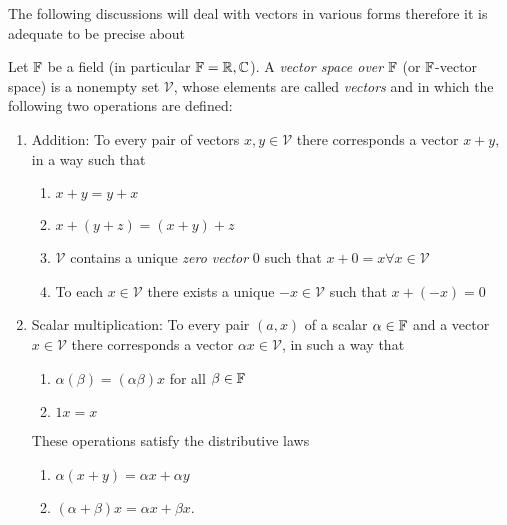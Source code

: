 The following discussions will deal with vectors in various forms therefore
it is adequate to be precise about
\begin{definition}
	Let $\mathbb{F}$ be a field (in particular $\mathbb{F} = \mathbb{R},\mathbb{C}$). A \emph{vector space
	over} $\mathbb{F}$ (or $\mathbb{F}$-vector space) is a nonempty set $\mathcal{V}$, whose
	elements are called \emph{vectors} and in which the following two operations
	are defined:
	\begin{enumerate}
		\item Addition: To every pair of vectors $x, y \in \mathcal{V}$ there
		corresponds a vector $x + y$, in a way such that
		\begin{enumerate}[label=(\alph*)]
			\item $x + y = y + x$
			\item $x + \left(y + z\right) = \left(x + y\right) + z$
			\item $\mathcal{V}$ contains a unique \emph{zero vector} $0$ such
			that $x + 0 = x \forall x \in \mathcal{V}$
			\item To each $x \in \mathcal{V}$ there exists a unique
			$-x \in \mathcal{V}$ such that $x + \left(-x\right) = 0$
		\end{enumerate}
		\item Scalar multiplication: To every pair $(a, x)$ of a scalar
		$\alpha \in \mathbb{F}$ and a vector $x \in \mathcal{V}$ there corresponds a
		vector $\alpha x \in \mathcal{V}$, in such a way that
		\begin{enumerate}[label=(\alph*), start = 5]
			\item $\alpha \left(\beta\right) = \left(\alpha \beta\right) x$ for
			all $\beta \in \mathbb{F}$ 
			\item $1 x = x$
		\end{enumerate}
		These operations satisfy the distributive laws
		\begin{enumerate}[label=(\alph*), start = 7]
			\item $\alpha \left(x + y\right) = \alpha x + \alpha y$
			\item $\left(\alpha + \beta\right) x = \alpha x + \beta x$.
		\end{enumerate}
	\end{enumerate}
\end{definition}

